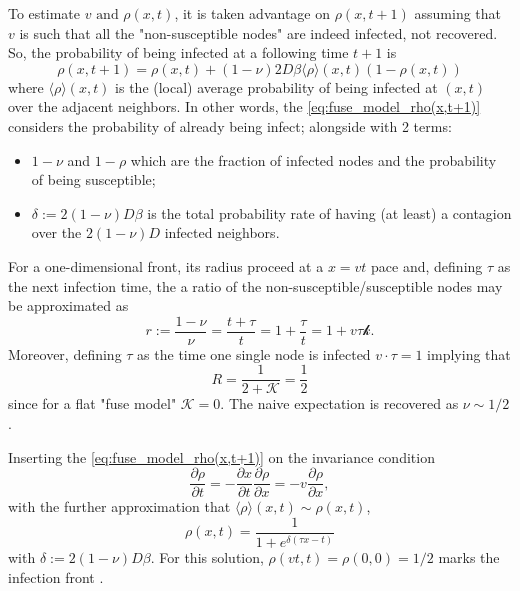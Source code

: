 \documentclass[a4paper,10pt,twoside]{book} %
\theoremstyle{definition}
\begin{document}
To estimate $v \text{ and } \rho(x,t)$, it is taken advantage on $\rho(x,t+1)$ assuming that $v$ is such that all the "non-susceptible nodes" are indeed infected, not recovered. So, the probability of being infected at a following time $t+1$ is
\begin{equation}
	\rho(x, t+1) = \rho(x,t)+(1-\nu)2D \beta \langle \rho \rangle(x,t) (1-\rho(x,t))
	\label{eq:fuse_model_rho(x,t+1)}
\end{equation}  
where $\langle \rho \rangle(x,t)$ is the (local) average probability of being infected at $(x,t)$ over the adjacent neighbors.
In other words, the \autoref{eq:fuse_model_rho(x,t+1)} considers the probability of already being infect; alongside with 2 terms:
\begin{itemize}
	\item $1-\nu$ and $1-\rho$ which are the fraction of infected nodes and the probability of being susceptible;
	\item $\delta:= 2(1-\nu)D \beta$ is the total probability rate of having (at least) a contagion over the $2(1-\nu)D$ infected neighbors.
\end{itemize}
For a one-dimensional front, its radius proceed at a $x=vt$ pace and, defining $\tau$ as the next infection time, the a ratio of the non-susceptible/susceptible nodes may be approximated as 
\begin{equation*}
	r:= \frac{1-\nu}{\nu} = \frac{t+\tau}{t} = 1+\frac{\tau}{t} = 1+v \tau \mathcal{k}.
\end{equation*}
Moreover, defining $\tau$ as the time one single node is infected $v \cdot \tau = 1$ implying that 
\[ R = \frac{1}{2+\mathcal{K}} = \frac{1}{2} \]
since for a flat "fuse model" $\mathcal{K} = 0$. 
The naive expectation is recovered as $\nu \sim 1/2$. 

Inserting the \autoref{eq:fuse_model_rho(x,t+1)} on the invariance condition 
\begin{equation}
	\frac{\partial \rho}{\partial t} = - \frac{\partial x}{\partial t} \frac{\partial \rho}{\partial x} = -v \frac{\partial \rho}{\partial x},
\end{equation}
with the further approximation that $\langle \rho \rangle(x,t) \sim \rho(x,t)$,
\begin{equation}
	\rho(x,t) = \frac{1}{1+e^{\delta(\tau x - t)}}
\end{equation}
with $\delta:= 2(1-\nu)D \beta$. 
For this solution, $\rho(vt,t) = \rho(0,0) = 1/2$ marks the infection front \cite{Thurner::Appendix_NetBasedExpl}. 
\end{document}
